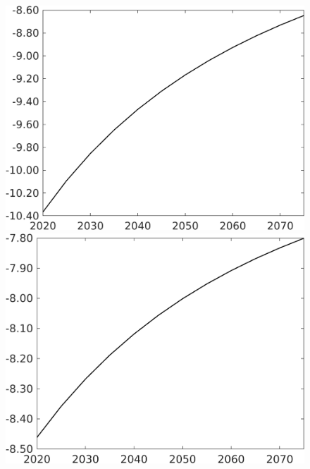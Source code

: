 \begin{figure}[h!!]
\begin{minipage}[]{0.32\textwidth}
	\end{minipage}		
	\begin{minipage}[]{0.32\textwidth}
		\includegraphics[width=1\textwidth]{../../codding_model/own_basedOnFried/optimalPol_010922_revision/figures/all_13Sept22/CompTaul_LFBAUPer_Reg0_C_spillover0_nsk1_xgr0_sep1_countec0_GovRev1_etaa0.79.png}
	\end{minipage}	
	\begin{minipage}[]{0.32\textwidth}
		\includegraphics[width=1\textwidth]{../../codding_model/own_basedOnFried/optimalPol_010922_revision/figures/all_13Sept22/CompTaul_LFBAUPer_Reg0_wsf_spillover0_nsk1_xgr0_sep1_countec0_GovRev1_etaa0.79.png}

\end{minipage}
\end{figure}
